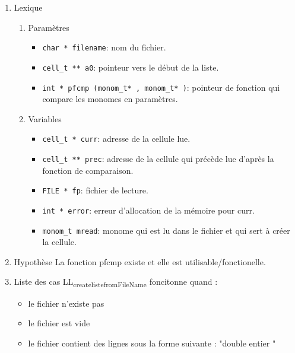 \documentclass[11pt]{article}
\begin{document}
\begin{enumerate}
\item Lexique
\label{sec:org89cf582}
\begin{enumerate}
\item Paramètres
\label{sec:org8aa7559}
\begin{itemize}
\item \texttt{char * filename}: nom du fichier.
\item \texttt{cell\_t ** a0}: pointeur vers le début de la liste.
\item \texttt{int * pfcmp (monom\_t* , monom\_t* )}: pointeur de fonction qui compare les monomes en paramètres.
\end{itemize}
\item Variables
\label{sec:org54b4582}
\begin{itemize}
\item \texttt{cell\_t * curr}: adresse de la cellule lue.
\item \texttt{cell\_t ** prec}: adresse de la cellule qui précède lue d'après la fonction de comparaison.
\item \texttt{FILE * fp}: fichier de lecture.
\item \texttt{int * error}: erreur d'allocation de la mémoire pour curr.
\item \texttt{monom\_t mread}: monome qui est lu dans le fichier et qui sert à créer la cellule.
\end{itemize}
\end{enumerate}

\item Hypothèse
\label{sec:org8e4e526}
La fonction pfcmp existe et elle est utilisable/fonctionelle.

\item Liste des cas
\label{sec:orgdceb8cb}
LL\textsubscript{create}\textsubscript{liste}\textsubscript{fromFileName} foncitonne quand :
\begin{itemize}
\item le fichier n'existe pas
\item le fichier est vide
\item le fichier contient des lignes sous la forme suivante : "double entier \n"
\end{itemize}
\end{enumerate}
\end{document}
